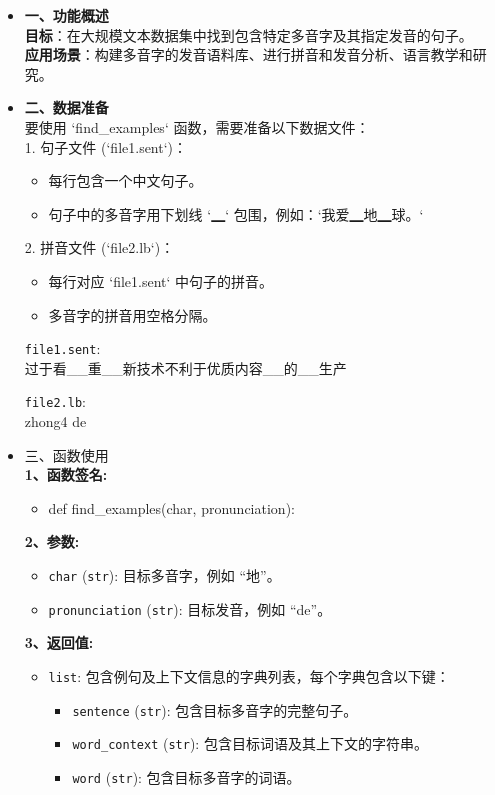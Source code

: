 \documentclass[12pt,hyperref,a4paper,UTF8]{ctexart}
\begin{document}
  \begin{itemize}
  \item \textbf{一、功能概述}\\
  \textbf{目标}：在大规模文本数据集中找到包含特定多音字及其指定发音的句子。\\
  \textbf{应用场景}：构建多音字的发音语料库、进行拼音和发音分析、语言教学和研究。
  \item \textbf{二、数据准备}\\
  要使用 `find\_examples` 函数，需要准备以下数据文件：\\
  1. 句子文件 (`file1.sent`)：
     \begin{itemize}
     \item 每行包含一个中文句子。
     \item 句子中的多音字用下划线 `▁` 包围，例如：`我爱▁地▁球。`
     \end{itemize}
  2. 拼音文件 (`file2.lb`)：
  \begin{itemize}
  \item 每行对应 `file1.sent` 中句子的拼音。
  \item 多音字的拼音用空格分隔。
  \end{itemize}
  \begin{tcolorbox}[colback=black!85!white, colframe=gray!80!black, title=示例内容, width=\linewidth, sharp corners, fontupper=\color{white}]
    \texttt{file1.sent}: \\
    过于看\_\_重\_\_新技术不利于优质内容\_\_的\_\_生产
    
    \texttt{file2.lb}: \\
    zhong4 de
\end{tcolorbox}

\item 三、函数使用\\
\textbf{1、函数签名:}
\begin{itemize}
    \item def find\_examples(char, pronunciation):
\end{itemize}
\textbf{2、参数:}
\begin{itemize}
    \item \texttt{char} (\texttt{str}): 目标多音字，例如 ``地''。
    \item \texttt{pronunciation} (\texttt{str}): 目标发音，例如 ``de''。
\end{itemize}

\textbf{3、返回值:}
\begin{itemize}
    \item \texttt{list}: 包含例句及上下文信息的字典列表，每个字典包含以下键：
    \begin{itemize}
        \item \texttt{sentence} (\texttt{str}): 包含目标多音字的完整句子。
        \item \texttt{word\_context} (\texttt{str}): 包含目标词语及其上下文的字符串。
        \item \texttt{word} (\texttt{str}): 包含目标多音字的词语。
    \end{itemize}
\end{itemize}

\end{itemize}
\end{document}
